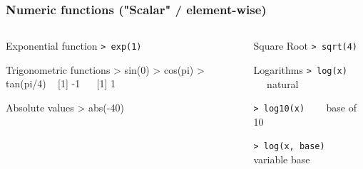 \documentclass[ucs]{beamer}
\begin{document}
 \begin{frame}
  \frametitle{Numeric functions ("Scalar" / element-wise)}
    \begin{columns}[T]
    \begin{column}{0.5\textwidth}
      \begin{block}{Exponential function}
\texttt{> exp(1)} 
      \end{block}
  
  \begin{block}{Trigonometric functions }
\footnotesize \ttfamily>\! sin(0) >\! cos(pi) >\! tan(pi/4)  ~  [1] -1 ~~  [1] 1
    \end{block}
    \begin{block}{Absolute values}
\ttfamily > abs(-40) 
  \end{block}    
  
  
    \end{column}
    \begin{column}{0.5\textwidth}
      
        \begin{block}{Square Root}
        \texttt{> sqrt(4)}
      \end{block}

\begin{block}{Logarithms}
\texttt{> log(x) } ~~ natural \newline

\texttt{> log10(x) } ~~ base of 10 \newline

\texttt{> log(x, base) } ~~ variable base \newline
\end{block}


      
    \end{column}
  \end{columns}
\end{frame}
\end{document}
